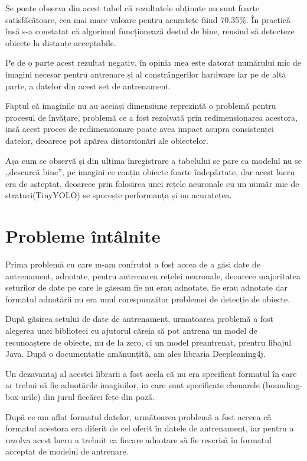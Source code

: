 \documentclass[a4paper, 12pt]{article}
\begin{document}
	Se poate observa din acest tabel că rezultatele obținute nu sunt foarte satisfăcătoare, cea mai mare valoare pentru acuratețe fiind 70.35\%. În practică însă s-a constatat că algorimul funcționează destul de bine, reusind să detecteze obiecte la distanțe acceptabile.
	
	Pe de o parte acest rezultat negativ, în opinia mea este datorat numărului mic de imagini necesar pentru antrenare și al constrângerilor hardware iar pe de altă parte, a datelor din acest set de antrenament. 
	
	Faptul că imaginile nu au aceiași dimensiune reprezintă o problemă pentru procesul de învățare, problemă ce a fost rezolvată prin redimensionarea acestora, insă acest proces de redimensionare poate avea impact asupra consistenței datelor, deoarece pot apărea distorsionări ale obiectelor.
	
	Așa cum se observă și din ultima înregistrare a tabelului se pare ca modelul nu se „descurcă bine”, pe imagini ce conțin obiecte foarte îndepărtate, dar acest lucru era de așteptat, deoarece prin folosirea unei rețele neuronale cu un număr mic de straturi(TinyYOLO) se sporește performanța și nu acuratețea. 
	
	
	
	\newpage
	\section{Probleme întâlnite}
	
	\quad\space Prima problemă cu care m-am confrutat a fost accea de a găsi date de antrenament, adnotate, pentru antrenarea rețelei neuronale, deoarece majoritatea seturilor de date pe care le găseam fie nu erau adnotate, fie erau adnotate dar formatul adnotării nu era unul corespunzător problemei de detecție de obiecte. 
	
	După găsirea setului de date de antrenament, urmatoarea problemă a fost alegerea unei biblioteci cu ajutorul căreia să pot antrena un model de recunoaștere de obiecte, nu de la zero, ci un model preantrenat, prentru libajul Java. După o documentație amănunțită, am ales libraria Deepleaning4j.
	
	Un dezavantaj al acestei librarii a fost acela că nu era specificat formatul în care ar trebui să fie adnotările imaginilor, in care sunt specificate chenarele (bounding-box-urile) din jurul fiecărei fețe din poză. 
	
	După ce am aflat formatul datelor, următoarea problemă a fost acceea că formatul acestora era diferit de cel oferit în datele de antrenament, iar pentru a rezolva acest lucru a trebuit ca fiecare adnotare să fie rescrisă în formatul acceptat de modelul de antrenare.
	
\end{document}
